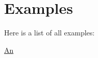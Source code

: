 \section{Examples}
Here is a list of all examples\+:\begin{DoxyCompactItemize}
\item 
\hyperlink{_an-example}{An}
\end{DoxyCompactItemize}
